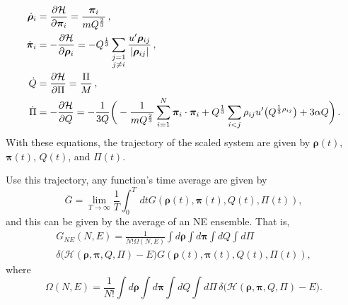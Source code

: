 \begin{align}
	\dot{ \bm{\rho} }_i & = \frac{ \partial \mathcal{H} }{ \partial \bm{\pi}_i } =
	\frac{ \bm{\pi}_i }{ m Q^{\frac{ 2 }{ 3 }} } \thinspace,                          \\
	\dot{ \bm{\pi} }_i  & = - \frac{ \partial \mathcal{H} }{ \partial \bm{\rho}_i } =
	- Q^{\frac{ 1 }{ 3 }} \sum_{\substack{j=1                                         \\j\neq i}}
	\frac{ u' \bm{\rho}_{ij} }{ \lvert \bm{\rho}_{ij} \rvert  } \thinspace,           \\
	\dot{ Q }           & = \frac{ \partial \mathcal{H} }{ \partial \Pi } =
	\frac{ \Pi }{ M } \thinspace,                                                     \\
	\dot{ \Pi }         & = - \frac{ \partial \mathcal{H} }{ \partial Q } =
	- \frac{ 1 }{ 3Q } \bigg(
	- \frac{ 1 }{ m Q^{\frac{ 2 }{ 3 }} }	\sum_{i=1}^{N} \bm{\pi}_i \cdot \bm{\pi}_i
	+ Q^{\frac{ 1 }{ 3 }} \sum_{i<j} \rho_{ij} u'\big(Q^{\frac{ 1 }{ 3 } \rho_{ij}}\big) +
	3 \alpha Q
	\bigg) \thinspace.
\end{align}
With these equations, the trajectory of the scaled system are given by
$\bm{\rho}(t)$, $\bm{\pi}(t)$, $Q(t)$, and $\Pi(t)$.

Use this trajectory, any function's time average are given by
\begin{equation}
	\overline{G} = \lim_{T \rightarrow \infty} \frac{ 1 }{ T } \int_{0}^{T}  \, dt
	G(\bm{\rho}(t), \bm{\pi}(t), Q(t), \Pi(t)),
\end{equation}
and this can be given by the average of an NE ensemble. That is,
\begin{multline}
	G_{NE} (N, E) = \frac{ 1 }{ N! \Omega(N,E) } \int d\bm{\rho} \int d\bm{\pi}
	\int dQ \int d\Pi \\
	\delta \big( \mathcal{H}(\bm{\rho}, \bm{\pi}, Q, \Pi)
	- E \big) G(\bm{\rho}(t), \bm{\pi}(t), Q(t), \Pi(t)),
\end{multline}
where
\begin{equation}
	\Omega(N, E) = \frac{ 1 }{ N! }  \int d\bm{\rho} \int d\bm{\pi}
	\int dQ \int d\Pi \, \delta \big( \mathcal{H}(\bm{\rho}, \bm{\pi}, Q, \Pi)
	- E \big).
\end{equation}

